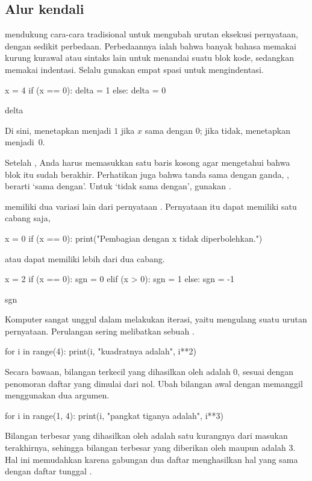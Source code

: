 \subsection{Alur kendali}
\python{} mendukung cara-cara tradisional untuk mengubah urutan 
eksekusi pernyataan, dengan sedikit perbedaan.
Perbedaannya ialah bahwa banyak bahasa memakai kurung kurawal atau sintaks lain untuk
menandai suatu blok kode, sedangkan \python{} memakai indentasi.
Selalu gunakan empat spasi untuk mengindentasi. %
\begin{pythonconsole}
x = 4
if (x == 0):
    delta = 1
else:
    delta = 0

delta
\end{pythonconsole}
Di sini, \python{} menetapkan  menjadi $1$ jika $x$
sama dengan $0$; jika tidak, \python{} menetapkan  menjadi~$0$. 

Setelah , Anda harus memasukkan 
satu baris kosong agar \python{} mengetahui bahwa blok itu sudah berakhir.
Perhatikan juga bahwa tanda sama dengan ganda, \inlinecode{==}, berarti `sama dengan'. 
Untuk `tidak sama dengan', gunakan \inlinecode{!=}. 

\python{} memiliki dua variasi lain dari pernyataan .
Pernyataan itu dapat memiliki satu cabang saja,
\begin{pythonconsole}
x = 0
if (x == 0):
    print("Pembagian dengan x tidak diperbolehkan.")

\end{pythonconsole}
atau dapat memiliki lebih dari dua cabang.
\begin{pythonconsole}
x = 2
if (x == 0):
    sgn = 0
elif (x > 0):
    sgn = 1
else:
    sgn = -1

sgn
\end{pythonconsole}

Komputer sangat unggul dalam melakukan iterasi, yaitu mengulang suatu urutan pernyataan.
Perulangan  sering melibatkan sebuah .
\begin{pythonconsole}
for i in range(4):
    print(i, "kuadratnya adalah", i**2)

\end{pythonconsole}
Secara bawaan, bilangan terkecil yang dihasilkan oleh  adalah $0$,
sesuai dengan penomoran daftar yang dimulai dari nol.
Ubah bilangan awal dengan memanggil  
menggunakan dua argumen.
\begin{pythonconsole}
for i in range(1, 4):
    print(i, "pangkat tiganya adalah", i**3)

\end{pythonconsole}
Bilangan terbesar yang dihasilkan oleh  adalah satu kurangnya dari 
masukan terakhirnya, sehingga bilangan terbesar
yang diberikan oleh  maupun  adalah $3$.
Hal ini memudahkan karena gabungan dua daftar
 menghasilkan 
hal yang sama dengan daftar tunggal .

